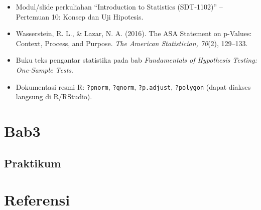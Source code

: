 \documentclass[
  indonesian,
  letterpaper,
]{book}
\providecommand{\tightlist}{%
  \setlength{\itemsep}{0pt}\setlength{\parskip}{0pt}}
\begin{document}
\begin{itemize}
\tightlist
\item
  Modul/slide perkuliahan ``Introduction to Statistics (SDT-1102)'' --
  Pertemuan 10: Konsep dan Uji Hipotesis.
\item
  Wasserstein, R. L., \& Lazar, N. A. (2016). The ASA Statement on
  p-Values: Context, Process, and Purpose. \emph{The American
  Statistician, 70}(2), 129--133.
\item
  Buku teks pengantar statistika pada bab \emph{Fundamentals of
  Hypothesis Testing: One-Sample Tests}.
\item
  Dokumentasi resmi R: \texttt{?pnorm}, \texttt{?qnorm},
  \texttt{?p.adjust}, \texttt{?polygon} (dapat diakses langsung di
  R/RStudio).
\end{itemize}


\chapter{Bab3}\label{bab3}

\section{Praktikum}\label{praktikum}


\chapter*{Referensi}\label{referensi}


\protect{}\label{refs}


\backmatter
\end{document}
